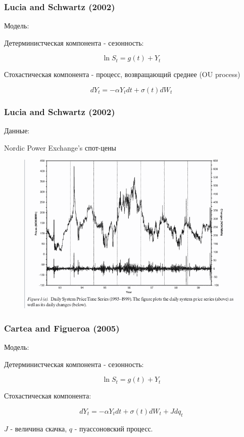 \documentclass[c, dvipsnames]{beamer}  %
\begin{document}
\begin{frame}[shrink=5]
\frametitle{Lucia and Schwartz (2002)} 

Модель: 

Детерминистческая компонента - сезонность:

$$\ln S_t = g(t) +Y_t$$

Стохастическая компонента - процесс, возвращающий среднее (OU process)

$$dY_t = -\alpha Y_t dt + \sigma(t) dW_t$$





\end{frame}



\begin{frame}[shrink=5]
\frametitle{Lucia and Schwartz (2002)} 

Данные: 

Nordic Power Exchange's спот-цены

\begin{figure}
	\centering
	\includegraphics[width=0.7\linewidth]{screenshot007}
	\caption{}
	\label{fig:screenshot007}
\end{figure}



\end{frame}




\begin{frame}[shrink=5]
\frametitle{Cartea and Figueroa (2005) } 

Модель: 

Детерминистческая компонента - сезонность:

$$\ln S_t = g(t) +Y_t$$

Стохастическая компонента:

$$dY_t = -\alpha Y_t dt + \sigma(t) dW_t + J dq_t$$

$J$ - величина скачка, $q$ - пуассоновский процесс.


\end{frame}
\end{document}

